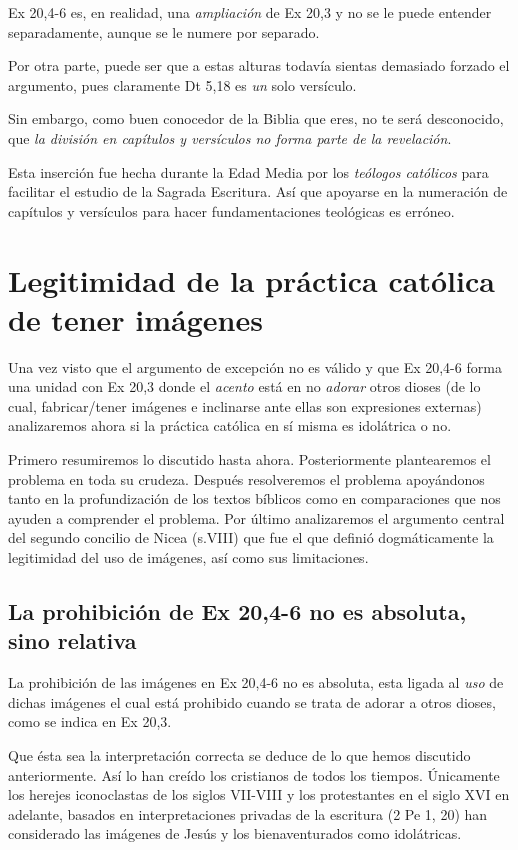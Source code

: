 \documentclass{article}
\begin{document}
Ex 20,4-6 es, en realidad, una \emph{ampliaci\'on} de Ex 20,3 y no se le puede entender separadamente, aunque se le numere por separado.

Por otra parte, puede ser que a estas alturas todav\'{i}a sientas demasiado forzado el argumento, pues claramente Dt 5,18 es \emph{un} solo vers\'{i}culo.

Sin embargo, como buen conocedor de la Biblia que eres, no te ser\'a desconocido, que \emph{la divisi\'on en cap\'{i}tulos y vers\'{i}culos no forma parte de la revelaci\'on}.

Esta inserci\'on fue hecha durante la Edad Media por los \emph{te\'ologos cat\'olicos} para facilitar el estudio de la Sagrada Escritura. As\'{i} que apoyarse en la numeraci\'on de cap\'{i}tulos y vers\'{i}culos para hacer fundamentaciones teol\'ogicas es err\'oneo.

\section{Legitimidad de la pr\'actica cat\'olica de tener im\'agenes}

Una vez visto que el argumento de excepci\'on no es v\'alido y que Ex 20,4-6 forma una unidad con Ex 20,3 donde el \emph{acento} est\'a en no \emph{adorar} otros dioses (de lo cual, fabricar/tener im\'agenes e inclinarse ante ellas son expresiones externas) analizaremos ahora si la pr\'actica cat\'olica en s\'{i} misma es idol\'atrica o no.

Primero resumiremos lo discutido hasta ahora. Posteriormente plantearemos el problema en toda su crudeza. Despu\'es resolveremos el problema apoy\'andonos tanto en la profundizaci\'on de los textos b\'{i}blicos como en comparaciones que nos ayuden a comprender el problema. Por \'ultimo analizaremos el argumento central del segundo concilio de Nicea (s.VIII) que fue el que defini\'o dogm\'aticamente la legitimidad del uso de im\'agenes, as\'{i} como sus limitaciones.

\subsection{La prohibici\'on de Ex 20,4-6 no es absoluta, sino relativa}

La prohibici\'on de las im\'agenes en Ex 20,4-6 no es absoluta, esta ligada al \emph{uso} de dichas im\'agenes el cual est\'a prohibido cuando se trata de adorar a otros dioses, como se indica en Ex 20,3.

Que \'esta sea la interpretaci\'on correcta se deduce de lo que hemos discutido anteriormente. As\'{i} lo han cre\'{i}do los cristianos de todos los tiempos. \'Unicamente los herejes iconoclastas de los siglos VII-VIII y los protestantes en el siglo XVI en adelante, basados en interpretaciones privadas de la escritura (2 Pe 1, 20) han considerado las im\'agenes de Jes\'us y los bienaventurados como idol\'atricas.
\end{document}
